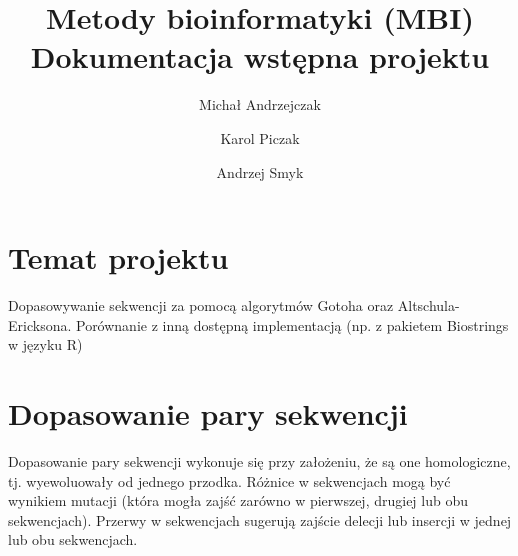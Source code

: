 \documentclass[a4paper,10pt]{article}
\title{Metody bioinformatyki (MBI)\\Dokumentacja wstępna projektu}
\author{Michał Andrzejczak
		\and
		Karol Piczak
		\and
		Andrzej Smyk
		}
\begin{document}
	\maketitle
	\section{Temat projektu}

	Dopasowywanie sekwencji za pomocą algorytmów Gotoha oraz Altschula-Ericksona. Porównanie z inną dostępną implementacją (np. z pakietem Biostrings w języku R)

	\section{Dopasowanie pary sekwencji}

	Dopasowanie pary sekwencji wykonuje się przy założeniu, że są one homologiczne, tj. wyewoluowały od jednego przodka. Różnice w sekwencjach mogą być wynikiem mutacji (która mogła zajść zarówno w pierwszej, drugiej lub obu sekwencjach). Przerwy w sekwencjach sugerują zajście delecji lub insercji w jednej lub obu sekwencjach.
\end{document}

